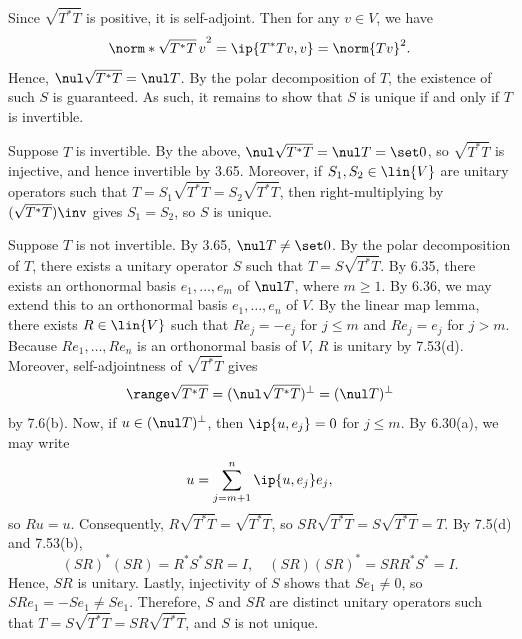 \begin{sol}
    Since $\sqrt{T^\ast T}$ is positive, it is self-adjoint.
    Then for any $v \in V$, we have
    \[
        \norm*{\sqrt{T^\ast T}\,v}^2 = \ip{T^\ast T v, v} = \norm{Tv}^2.
    \]
    Hence, $\nul \sqrt{T^\ast T} = \nul T$.
    By the polar decomposition of $T$, the existence of such $S$ is guaranteed.
    As such, it remains to show that $S$ is unique if and only if $T$ is invertible.

    \rightimp Suppose $T$ is invertible.
    By the above, $\nul \sqrt{T^\ast T} = \nul T = \set 0$, so $\sqrt{T^\ast T}$ is injective, and hence invertible by 3.65.
    Moreover, if $S_1, S_2 \in \lin{V}$ are unitary operators such that $T = S_1 \sqrt{T^\ast T} = S_2 \sqrt{T^\ast T}$, then right-multiplying by $(\sqrt{T^\ast T})\inv$ gives $S_1 = S_2$, so $S$ is unique.

    \leftimp Suppose $T$ is not invertible.
    By 3.65, $\nul T \neq \set 0$.
    By the polar decomposition of $T$, there exists a unitary operator $S$ such that $T = S\sqrt{T^\ast T}$.
    By 6.35, there exists an orthonormal basis $e_1, \ldots, e_m$ of $\nul T$, where $m \geq 1$.
    By 6.36, we may extend this to an orthonormal basis $e_1, \ldots, e_n$ of $V$.
    By the linear map lemma, there exists $R \in \lin{V}$ such that $R e_j = -e_j$ for $j \leq m$ and $R e_j = e_j$ for $j > m$.
    Because $R e_1, \ldots, R e_n$ is an orthonormal basis of $V$, $R$ is unitary by 7.53(d).
    Moreover, self-adjointness of $\sqrt{T^\ast T}$ gives
    \[
        \range \sqrt{T^\ast T} = (\nul \sqrt{T^\ast T})^\perp = (\nul T)^\perp
    \]
    by 7.6(b).
    Now, if $u \in (\nul T)^\perp$, then $\ip{u, e_j} = 0$ for $j \leq m$.
    By 6.30(a), we may write
    \[
        u = \sum_{j=m+1}^{n} \ip{u, e_j} e_j,
    \]
    so $R u = u$.
    Consequently, $R \sqrt{T^\ast T} = \sqrt{T^\ast T}$, so $SR \sqrt{T^\ast T} = S \sqrt{T^\ast T} = T$.
    By 7.5(d) and 7.53(b),
    \[
        (SR)^\ast (SR) = R^\ast S^\ast SR = I, \quad (SR)(SR)^\ast = SR R^\ast S^\ast = I.
    \]
    Hence, $SR$ is unitary.
    Lastly, injectivity of $S$ shows that $S e_1 \neq 0$, so $SR e_1 = - Se_1 \neq S e_1$.
    Therefore, $S$ and $SR$ are distinct unitary operators such that $T = S\sqrt{T^\ast T} = SR\sqrt{T^\ast T}$, and $S$ is not unique.
\end{sol}


